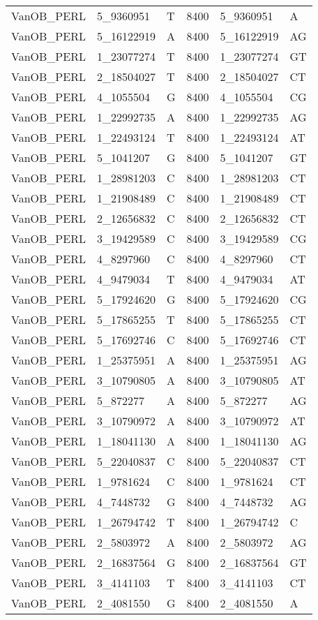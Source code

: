 \begin{center}
\begin{longtable}{|l|l|l|l|l|l|}
VanOB\_PERL&5\_9360951&T&8400&5\_9360951&A\\
VanOB\_PERL&5\_16122919&A&8400&5\_16122919&AG\\
VanOB\_PERL&1\_23077274&T&8400&1\_23077274&GT\\
VanOB\_PERL&2\_18504027&T&8400&2\_18504027&CT\\
VanOB\_PERL&4\_1055504&G&8400&4\_1055504&CG\\
VanOB\_PERL&1\_22992735&A&8400&1\_22992735&AG\\
VanOB\_PERL&1\_22493124&T&8400&1\_22493124&AT\\
VanOB\_PERL&5\_1041207&G&8400&5\_1041207&GT\\
VanOB\_PERL&1\_28981203&C&8400&1\_28981203&CT\\
VanOB\_PERL&1\_21908489&C&8400&1\_21908489&CT\\
VanOB\_PERL&2\_12656832&C&8400&2\_12656832&CT\\
VanOB\_PERL&3\_19429589&C&8400&3\_19429589&CG\\
VanOB\_PERL&4\_8297960&C&8400&4\_8297960&CT\\
VanOB\_PERL&4\_9479034&T&8400&4\_9479034&AT\\
VanOB\_PERL&5\_17924620&G&8400&5\_17924620&CG\\
VanOB\_PERL&5\_17865255&T&8400&5\_17865255&CT\\
VanOB\_PERL&5\_17692746&C&8400&5\_17692746&CT\\
VanOB\_PERL&1\_25375951&A&8400&1\_25375951&AG\\
VanOB\_PERL&3\_10790805&A&8400&3\_10790805&AT\\
VanOB\_PERL&5\_872277&A&8400&5\_872277&AG\\
VanOB\_PERL&3\_10790972&A&8400&3\_10790972&AT\\
VanOB\_PERL&1\_18041130&A&8400&1\_18041130&AG\\
VanOB\_PERL&5\_22040837&C&8400&5\_22040837&CT\\
VanOB\_PERL&1\_9781624&C&8400&1\_9781624&CT\\
VanOB\_PERL&4\_7448732&G&8400&4\_7448732&AG\\
VanOB\_PERL&1\_26794742&T&8400&1\_26794742&C\\
VanOB\_PERL&2\_5803972&A&8400&2\_5803972&AG\\
VanOB\_PERL&2\_16837564&G&8400&2\_16837564&GT\\
VanOB\_PERL&3\_4141103&T&8400&3\_4141103&CT\\
VanOB\_PERL&2\_4081550&G&8400&2\_4081550&A\\

\end{longtable}
\end{center}
